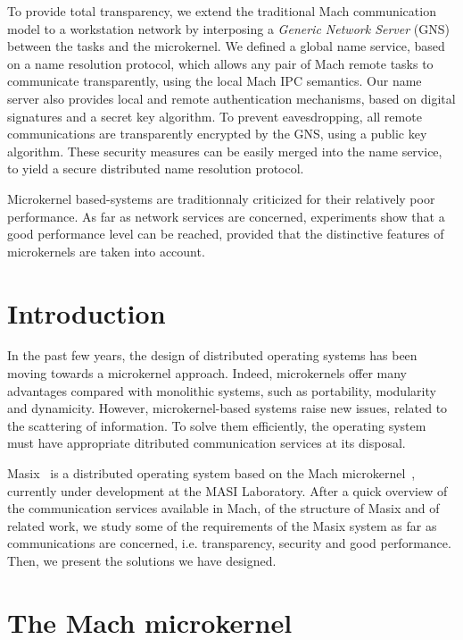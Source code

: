 	To provide total 
	transparency, we extend the traditional Mach communication model 
	to a workstation network by interposing a {\it Generic Network Server} 		(GNS) between the tasks and the microkernel. We defined a global 
	name service, based on a name resolution protocol, which allows any
	pair of Mach remote tasks to communicate transparently, using the local
	Mach IPC semantics. Our name server also provides local and remote 
	authentication mechanisms, based on digital signatures and a secret key 
	algorithm.
	To prevent eavesdropping, all remote communications are transparently 
	encrypted by the GNS, using a public key algorithm.
	These security measures can be easily merged into the name service, 
	to yield a secure distributed name resolution protocol. 

	Microkernel based-systems are traditionnaly criticized for their 
	relatively poor performance. As far as network services are concerned,
	experiments show that a good performance level can be reached, provided 	that the distinctive features of microkernels are taken into account.

\section{Introduction}

In the past few years, the design of distributed operating systems has been
moving towards a microkernel approach. 
Indeed, microkernels offer many advantages compared with monolithic systems, 
such as portability, modularity and dynamicity.
However, microkernel-based systems raise new issues, related to the scattering 
of information. To solve them efficiently, the operating system must have 
appropriate ditributed communication services at its disposal.

Masix~\cite{masix:osf} is a distributed operating system based on the 
Mach microkernel~\cite{mach:foundation}, currently under development at the 
MASI Laboratory. After a quick overview of the communication services 
available in Mach, of the structure of Masix and of related work, we 
study some of the requirements of the Masix system as far as communications 
are concerned, i.e. transparency, security and good performance. Then, we 
present the solutions we have designed.

\section {The Mach microkernel}

